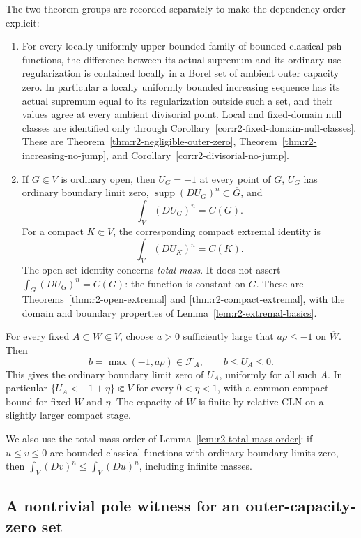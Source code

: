 The two theorem groups are recorded separately to make the dependency
order explicit:
\begin{enumerate}[label=\textup{(\Alph*)}]
\item[\textup{(N)}] For every locally uniformly upper-bounded family
of bounded classical psh functions, the difference between its actual
supremum and its ordinary usc regularization is contained locally in
a Borel set of ambient outer capacity zero. In particular a locally
uniformly bounded increasing sequence has its actual supremum equal
to its regularization outside such a set, and their values agree at
every ambient divisorial point. Local and fixed-domain null classes
are identified only through
Corollary~\ref{cor:r2-fixed-domain-null-classes}.
These are Theorem~\ref{thm:r2-negligible-outer-zero},
Theorem~\ref{thm:r2-increasing-no-jump}, and
Corollary~\ref{cor:r2-divisorial-no-jump}.

\item[\textup{(E)}] If $G\Subset V$ is ordinary open, then $U_G=-1$
at every point of $G$, $U_G$ has ordinary boundary limit zero,
$\operatorname{supp}(DU_G)^n\subset\overline G$, and
\[
 \int_V(DU_G)^n=C(G).
\]
For a compact $K\Subset V$, the corresponding compact extremal
identity is
\[
 \int_V(DU_K)^n=C(K).
\]
The open-set identity concerns \emph{total mass}. It does not assert
$\int_G(DU_G)^n=C(G)$: the function is constant on $G$.
These are Theorems~\ref{thm:r2-open-extremal} and
\ref{thm:r2-compact-extremal}, with the domain and boundary
properties of Lemma~\ref{lem:r2-extremal-basics}.
\end{enumerate}

For every fixed $A\subset W\Subset V$, choose $a>0$ sufficiently
large that $a\rho\leq-1$ on $\overline W$. Then
\[
 b=\max(-1,a\rho)\in\mathcal F_A,
 \qquad b\leq U_A\leq0.
\]
This gives the ordinary boundary limit zero of $U_A$, uniformly for
all such $A$. In particular $\{U_A<-1+\eta\}\Subset V$ for every
$0<\eta<1$, with a common compact bound for fixed $W$ and $\eta$.
The capacity of $W$ is finite by relative CLN on a slightly larger
compact stage.

We also use the total-mass order of
Lemma~\ref{lem:r2-total-mass-order}: if $u\leq v\leq0$ are bounded
classical functions with ordinary boundary limits zero, then
$\int_V(Dv)^n\leq\int_V(Du)^n$, including infinite masses.

\subsection{A nontrivial pole witness for an outer-capacity-zero set}

